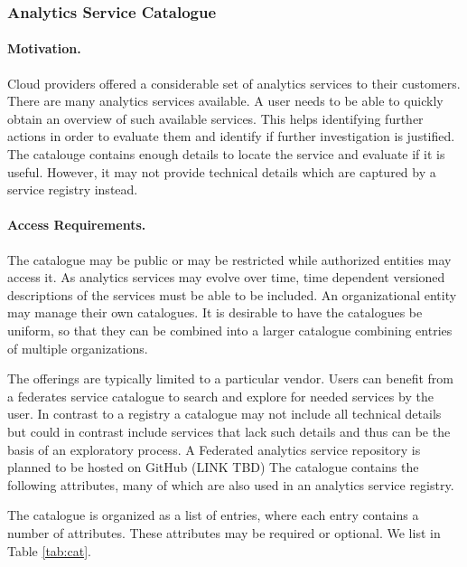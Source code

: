 \subsubsection{Analytics Service Catalogue}
\label{sec:catalog}

\paragraph{Motivation.}
Cloud providers offered a considerable set of analytics services to
their customers. There are many analytics services available. A user
needs to be able to quickly obtain an overview of such available
services. This helps identifying further actions in order to evaluate
them and identify if further investigation is justified. The catalouge
contains enough details to locate the service and evaluate if it is
useful. However, it may not provide technical details which are
captured by a service registry instead.

\paragraph{Access Requirements.}
The catalogue may be public or may be restricted while authorized
entities may access it. As analytics services may evolve over time,
time dependent versioned descriptions of the services must be able to
be included. An organizational entity may manage their own
catalogues. It is desirable to have the catalogues be uniform, so that
they can be combined into a larger catalogue combining entries of
multiple organizations.


The offerings are typically limited to a particular vendor. Users can
benefit from a federates service catalogue to search and explore for
needed services by the user. In contrast to a registry a catalogue may
not include all technical details but could in contrast include
services that lack such details and thus can be the basis of an
exploratory process.  A Federated analytics service repository is
planned to be hosted on GitHub (LINK TBD) The catalogue contains the
following attributes, many of which are also used in an analytics
service registry.

The catalogue is organized as a list of entries, where each entry
contains a number of attributes. These attributes may be required or
optional. We list in Table \ref{tab:cat}.


